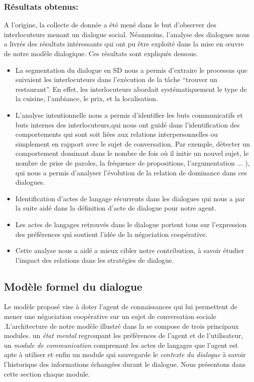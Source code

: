 \documentclass[a4paper,french]{article}
\begin{document}
\subsubsection{Résultats obtenus:}
\par A l'origine, la collecte de donnée a été mené dans le but d'observer des interlocuteurs menant un dialogue social. Néanmoins, l'analyse des dialogues nous a livrés des résultats intéressants qui ont pu être exploité dans la mise en œuvre de notre modèle dialogique.  Ces résultats sont expliqués dessous.

\begin{itemize}

		\item  La segmentation du dialogue en SD nous a permis d'extraire le processus que suivaient les interlocuteurs dans l'exécution de la tâche  ``trouver un restaurant''. En effet, les interlocuteurs abordait systématiquement le type de la cuisine, l'ambiance, le prix, et la localisation. 
		
		\item L'analyse intentionnelle nous a permis d'identifier les buts communicatifs et buts internes des interlocuteurs,qui nous ont guidé dans l'identification des comportements qui sont soit liées aux relations interpersonnelles ou simplement en rapport avec le sujet de conversation. Par exemple, détecter un comportement dominant dans le nombre de fois où il initie un nouvel sujet, le nombre de prise de paroles, la fréquence de propositions, l'argumentation ... ), qui nous a permis d'analyser l'évolution de la relation de dominance dans ces dialogues. 
		\item Identification d'actes de langage récurrents dans les dialogues qui nous a par la suite aidé dans la définition d'acte de dialogue pour notre agent.	
		\item Les actes de langages retrouvés dans le dialogue portent tous sur l'expression des préférences qui soutient l'idée de la négociation coopérative.
		\item Cette analyse nous a aidé a mieux cibler notre contribution, à savoir étudier l'impact des relations dans les stratégies de dialogue.

	
	
\end{itemize}


\subsection{Modèle formel du dialogue}
\par Le modèle proposé vise à doter l'agent de connaissances qui lui permettent de mener une négociation coopérative sur un sujet de conversation sociale
.L'architecture de notre modèle illustré dans la  se compose de trois principaux modules. un \textit{état mental} regroupant les préférences de l'agent et de l'utilisateur, un \textit{module de communication} comprenant les actes de langages que l'agent est apte à utiliser et enfin un module qui sauvegarde le \textit{contexte du dialogue} à savoir l'historique des informations échangées durant le dialogue. Nous présentons dans cette section chaque module.
\end{document}
